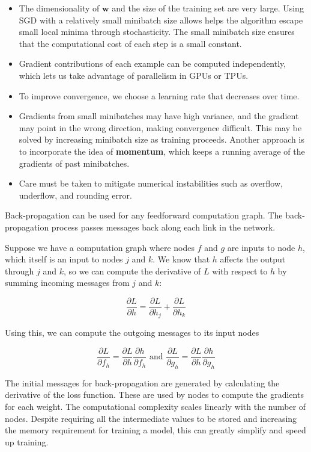 \documentclass{article}
\begin{document}
\begin{itemize}
    \item The dimensionality of $\textbf{w}$ and the size of the training set are very
        large. Using SGD with a relatively small minibatch size allows helps the algorithm
        escape small local minima through stochasticity. The small minibatch size ensures
        that the computational cost of each step is a small constant.
    \item Gradient contributions of each example can be computed independently, which
        lets us take advantage of parallelism in GPUs or TPUs.
    \item To improve convergence, we choose a learning rate that decreases over time.
    \item Gradients from small minibatches may have high variance, and the gradient may
        point in the wrong direction, making convergence difficult. This may be solved
        by increasing minibatch size as training proceeds. Another approach is to
        incorporate the idea of \textbf{momentum}, which keeps a running average of 
        the gradients of past minibatches.
    \item Care must be taken to mitigate numerical instabilities such as overflow,
        underflow, and rounding error.
\end{itemize}

Back-propagation can be used for any feedforward computation graph. The back-propagation
process passes messages back along each link in the network.

Suppose we have a computation graph where nodes $f$ and $g$ are inputs to node $h$,
which itself is an input to nodes $j$ and $k$. We know that $h$ affects the output
through $j$ and $k$, so we can compute the derivative of $L$ with respect to $h$
by summing incoming messages from $j$ and $k$:

\[
\frac{\partial L}{\partial h} = \frac{\partial L}{\partial h_j} + \frac{\partial L}{\partial h_k}
\]

Using this, we can compute the outgoing messages to its input nodes

\[
\frac{\partial L}{\partial f_h} = \frac{\partial L}{\partial h} \frac{\partial h}{\partial f_h} \text{ and }
\frac{\partial L}{\partial g_h} = \frac{\partial L}{\partial h} \frac{\partial h}{\partial g_h}
\]

The initial messages for back-propagation are generated by calculating the derivative of the loss function. 
These are used by nodes to compute the gradients for each weight. The computational complexity
scales linearly with the number of nodes. Despite requiring all the intermediate values to be
stored and increasing the memory requirement for training a model, this can  greatly simplify
and speed up training.
\end{document}
